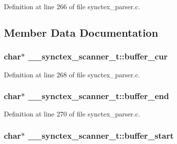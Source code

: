 Definition at line 266 of file synctex\+\_\+parser.\+c.



\subsection{Member Data Documentation}
\hypertarget{struct____synctex__scanner__t_a3ace5951a9bb76b02d0cb52a807492c1}{
\subsubsection[{buffer\+\_\+cur}]{\setlength{\rightskip}{0pt plus 5cm}char$\ast$ \+\_\+\+\_\+synctex\+\_\+scanner\+\_\+t\+::buffer\+\_\+cur}}\label{struct____synctex__scanner__t_a3ace5951a9bb76b02d0cb52a807492c1}


Definition at line 268 of file synctex\+\_\+parser.\+c.

\hypertarget{struct____synctex__scanner__t_a1bd226b12b6aaad54083ce8969273b32}{
\subsubsection[{buffer\+\_\+end}]{\setlength{\rightskip}{0pt plus 5cm}char$\ast$ \+\_\+\+\_\+synctex\+\_\+scanner\+\_\+t\+::buffer\+\_\+end}}\label{struct____synctex__scanner__t_a1bd226b12b6aaad54083ce8969273b32}


Definition at line 270 of file synctex\+\_\+parser.\+c.

\hypertarget{struct____synctex__scanner__t_ab45b78f37503ecad42a2d59db482aa84}{
\subsubsection[{buffer\+\_\+start}]{\setlength{\rightskip}{0pt plus 5cm}char$\ast$ \+\_\+\+\_\+synctex\+\_\+scanner\+\_\+t\+::buffer\+\_\+start}}\label{struct____synctex__scanner__t_ab45b78f37503ecad42a2d59db482aa84}



